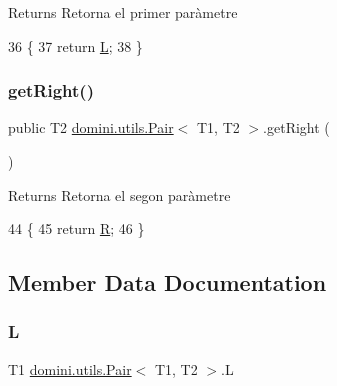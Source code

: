 \begin{DoxyReturn}{Returns}
Retorna el primer paràmetre 
\end{DoxyReturn}

\begin{DoxyCode}
36                         \{
37         \textcolor{keywordflow}{return} \hyperlink{classdomini_1_1utils_1_1Pair_a276a0eee9fa97fc27b37fab887f07cea}{L};
38     \}
\end{DoxyCode}
\mbox{\label{classdomini_1_1utils_1_1Pair_a0dca94eb1a43952258bebe1dca4c84e9}} 
\subsubsection{\texorpdfstring{get\+Right()}{getRight()}}
{\footnotesize\ttfamily public T2 \hyperlink{classdomini_1_1utils_1_1Pair}{domini.\+utils.\+Pair}$<$ T1, T2 $>$.get\+Right (\begin{DoxyParamCaption}{ }\end{DoxyParamCaption})\hspace{0.3cm}{\ttfamily [inline]}}

\begin{DoxyReturn}{Returns}
Retorna el segon paràmetre 
\end{DoxyReturn}

\begin{DoxyCode}
44                          \{
45         \textcolor{keywordflow}{return} \hyperlink{classdomini_1_1utils_1_1Pair_aebf54d48000999b84e5e24a2c62088d4}{R};
46     \}
\end{DoxyCode}


\subsection{Member Data Documentation}
\mbox{\label{classdomini_1_1utils_1_1Pair_a276a0eee9fa97fc27b37fab887f07cea}} 
\subsubsection{\texorpdfstring{L}{L}}
{\footnotesize\ttfamily T1 \hyperlink{classdomini_1_1utils_1_1Pair}{domini.\+utils.\+Pair}$<$ T1, T2 $>$.L}


